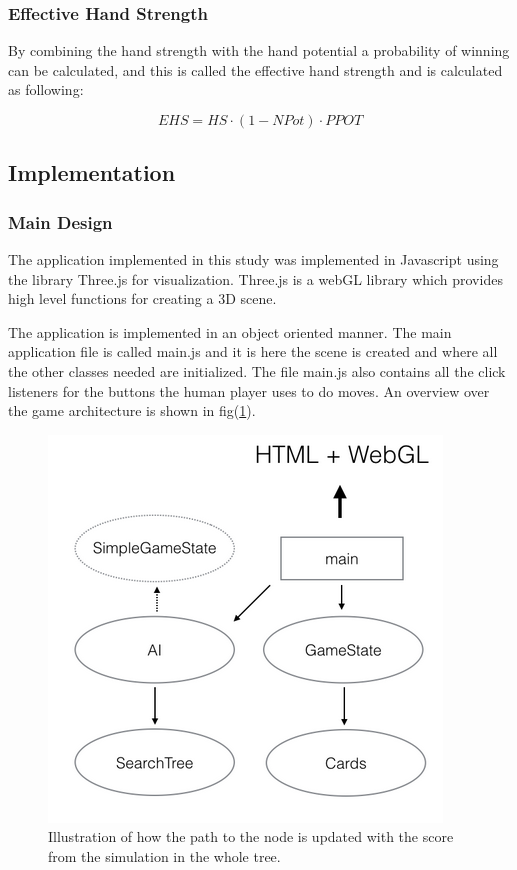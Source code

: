 \documentclass[journal]{vgtc}                %
\begin{document}
\subsubsection{Effective Hand Strength}
By combining the hand strength with the hand potential a probability of winning can be calculated, and this is called the effective hand strength and is calculated as following:

\begin{equation} \label{EHS}
	EHS = HS \cdot (1-NPot) \cdot PPOT
\end{equation}

\subsection{Implementation}
\subsubsection{Main Design}
The application implemented in this study was implemented in Javascript using the library Three.js for visualization. Three.js is a webGL library which provides high level functions for creating a 3D scene.

The application is implemented in an object oriented manner. The main application file is called main.js and it is here the scene is created and where all the other classes needed are initialized. The file main.js also contains all the click listeners for the buttons the human player uses to do moves. An overview over the game architecture is shown in fig(\ref{fig:arcitect}). 
\begin{figure}[here]
  \begin{center}
    \includegraphics[scale=0.50]{img/arcitect.png}
    \caption{\label{fig:arcitect} Illustration of how the path to the node is updated with the score from the simulation in the whole tree.}
  \end{center}
\end{figure}
\end{document}
